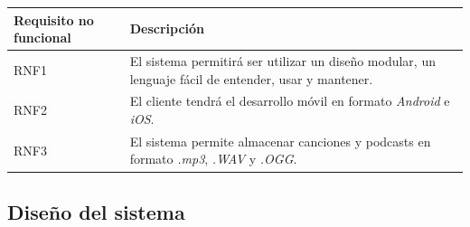 \documentclass{article}
\begin{document}
\begin{table}[H]
	\begin{tabular}{p{4cm} p{10cm}}
		\hline
		\hline 
		\textbf{Requisito no funcional} & \textbf{Descripción} \\ 
		\hline
		\hline
		RNF1 
		&  El sistema permitirá ser utilizar un diseño modular, un lenguaje fácil de entender, usar y mantener.\\ 
		\hline
		RNF2
		&  El cliente tendrá el desarrollo móvil en formato \textit{Android} e \textit{iOS}.\\ 
		\hline
		RNF3
		& El sistema permite almacenar canciones y podcasts en formato \textit{.mp3}, \textit{.WAV} y \textit{.OGG}. \\
	\end{tabular}
\end{table}
\newpage

\subsection{Diseño del sistema}
\end{document}
